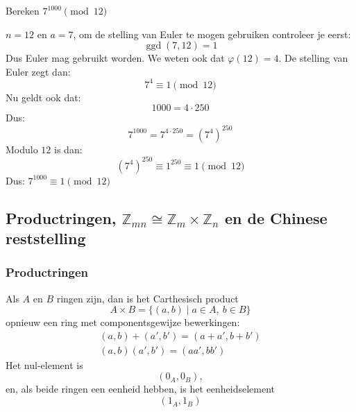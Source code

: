 \textbf{} Bereken $7^{1000} \pmod{12}$

 $n=12$ en $a=7$, om de stelling van Euler te mogen gebruiken controleer je eerst:
\begin{equation*}
    \operatorname{ggd}(7,12) = 1
\end{equation*}
Dus Euler mag gebruikt worden. We weten ook dat $\varphi(12)=4$. De stelling van Euler zegt dan:
\begin{equation*}
    7^4 \equiv 1 \pmod{12}
\end{equation*}
Nu geldt ook dat:
\begin{equation*}
    1000 = 4 \cdot 250
\end{equation*}
Dus:
\begin{equation*}
    7^{1000} = 7^{4 \cdot 250} = (7^4)^{250}
\end{equation*}
Modulo $12$ is dan:
\begin{equation*}
    (7^4)^{250} \equiv 1^{250} \equiv 1 \pmod{12}
\end{equation*}
Dus: $7^{1000} \equiv 1 \pmod{12}$

\subsection{Productringen, \texorpdfstring{$\mathbb{Z}_{mn} \cong \mathbb{Z}_m \times \mathbb{Z}_n$}{Zmn tgo Zm x Zn} en de Chinese reststelling}

\subsubsection{Productringen}

Als $A$ en $B$ ringen zijn, dan is het Carthesisch product
\begin{equation*}
    A \times B = \{(a,b) \mid a \in A,\ b \in B\}
\end{equation*}
opnieuw een ring met componentsgewijze bewerkingen:
\begin{equation*}
    \begin{gathered}
        (a,b) + (a',b') = (a + a', b + b') \\
        (a,b)(a',b') = (aa', bb')
    \end{gathered}
\end{equation*}
Het nul-element is
\begin{equation*}
    (0_A, 0_B),
\end{equation*}
en, als beide ringen een eenheid hebben, is het eenheidselement
\begin{equation*}
    (1_A, 1_B)
\end{equation*}

